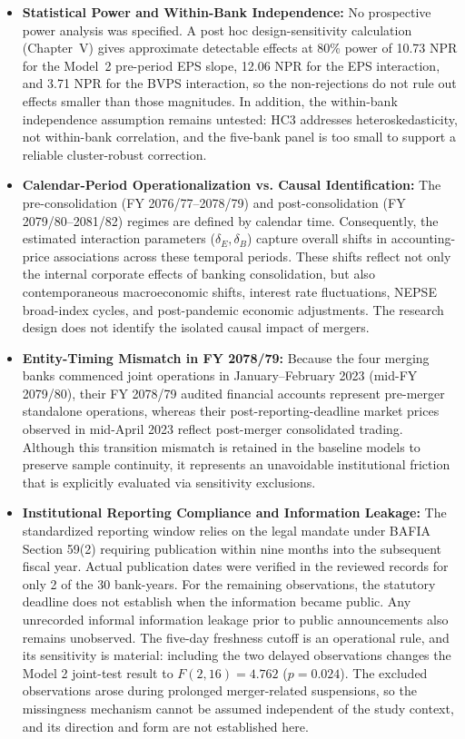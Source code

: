 \begin{itemize}
\item \textbf{Statistical Power and Within-Bank Independence:}
No prospective power analysis was specified. A post hoc design-sensitivity calculation (Chapter~V) gives approximate detectable effects at 80\% power of 10.73 NPR for the Model~2 pre-period EPS slope, 12.06 NPR for the EPS interaction, and 3.71 NPR for the BVPS interaction, so the non-rejections do not rule out effects smaller than those magnitudes. In addition, the within-bank independence assumption remains untested: HC3 addresses heteroskedasticity, not within-bank correlation, and the five-bank panel is too small to support a reliable cluster-robust correction.

\item \textbf{Calendar-Period Operationalization vs. Causal Identification:}
The pre-consolidation (FY 2076/77--2078/79) and post-consolidation (FY 2079/80--2081/82) regimes are defined by calendar time. Consequently, the estimated interaction parameters ($\delta_E, \delta_B$) capture overall shifts in accounting-price associations across these temporal periods. These shifts reflect not only the internal corporate effects of banking consolidation, but also contemporaneous macroeconomic shifts, interest rate fluctuations, NEPSE broad-index cycles, and post-pandemic economic adjustments. The research design does not identify the isolated causal impact of mergers.

\item \textbf{Entity-Timing Mismatch in FY 2078/79:}
Because the four merging banks commenced joint operations in January--February 2023 (mid-FY 2079/80), their FY 2078/79 audited financial accounts represent pre-merger standalone operations, whereas their post-reporting-deadline market prices observed in mid-April 2023 reflect post-merger consolidated trading. Although this transition mismatch is retained in the baseline models to preserve sample continuity, it represents an unavoidable institutional friction that is explicitly evaluated via sensitivity exclusions.

\item \textbf{Institutional Reporting Compliance and Information Leakage:}
The standardized reporting window relies on the legal mandate under BAFIA Section 59(2) requiring publication within nine months into the subsequent fiscal year. Actual publication dates were verified in the reviewed records for only 2 of the 30 bank-years. For the remaining observations, the statutory deadline does not establish when the information became public. Any unrecorded informal information leakage prior to public announcements also remains unobserved. The five-day freshness cutoff is an operational rule, and its sensitivity is material: including the two delayed observations changes the Model 2 joint-test result to $F(2,16)=4.762$ ($p=0.024$). The excluded observations arose during prolonged merger-related suspensions, so the missingness mechanism cannot be assumed independent of the study context, and its direction and form are not established here.
\end{itemize}

